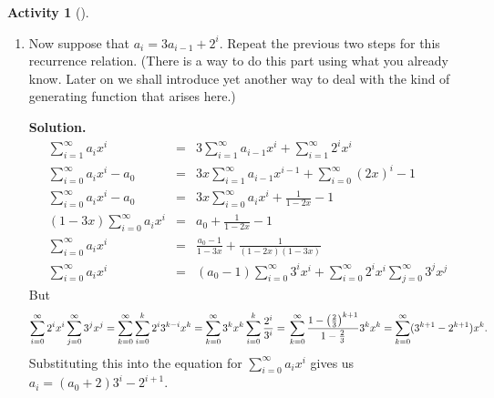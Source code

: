 \documentclass[10pt,]{book}
\theoremstyle{plain}
\theoremstyle{definition}
\newtheorem{activity}[project]{Activity}
\numberwithin{equation}{chapter}
\newcommand{\amp}{&}
\begin{document}
\begin{activity}[]
\begin{enumerate}[label=(\alph*)]
~\par
\item Now suppose that \(a_i=3a_{i-1} + 2^i\).  Repeat the previous two steps for this recurrence relation.  (There is a way to do this part using what you already know.  Later on we shall introduce yet another way to deal with the kind of generating function that arises here.)%
\par\medskip\noindent%
\textbf{Solution.}\quad %
\begin{align*}
\sum_{i=1}^\infty a_ix^i\amp =\amp 3\sum_{i=1}^\infty
a_{i-1}x^i +\sum_{i=1}^\infty 2^ix^i\\
\sum_{i=0}^\infty a_ix^i -a_0 \amp =\amp 3x\sum_{i=1}^\infty a_{i-1}x^{i-1}
+\sum_{i=0}^\infty (2x)^i -1\\
\sum_{i=0}^\infty a_ix^i -a_0 \amp =\amp 3x\sum_{i=0}^\infty a_ix^i +\frac{1}{1-2x} -1\\
(1-3x)\sum_{i=0}^\infty a_ix^i\amp =\amp a_0 +\frac{1}{1-2x}-1\\
\sum_{i=0}^\infty a_ix^i\amp =\amp  \frac{a_0-1}{1-3x}+\frac{1}{(1-2x)(1-3x)}\\
\sum_{i=0}^\infty a_ix^i\amp =\amp (a_0-1)\sum_{i=0}^\infty 3^ix^i +\sum_{i=0}^\infty
2^ix^i\sum_{j=0}^\infty 3^jx^j
\end{align*}
But%
\begin{equation*}
\displaystyle\sum_{i=0}^\infty
2^ix^i\sum_{j=0}^\infty 3^jx^j=
\sum_{k=0}^\infty
\sum_{i=0}^k 2^i3^{k-i}x^k=
\sum_{k=0}^\infty3^kx^k
\sum_{i=0}^k \frac{2^i}{3^i}=\\ \sum_{k=0}^\infty{1-\left(\frac{2}{3}\right)^{k+1}\over 1-\frac{2}{3}}3^kx^k=\sum_{k=0}^\infty
(3^{k+1}-2^{k+1})x^k\text{.}
\end{equation*}
Substituting this into the equation for \(\sum_{i=0}^\infty a_ix^i\) gives us \(a_i =(a_0+2)3^i -2^{i+1}\).%

\end{enumerate}
\end{activity}
\end{document}
